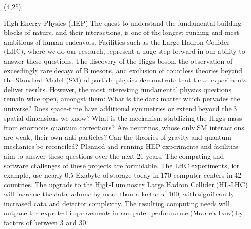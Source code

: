 \documentclass[final]{beamer}
\begin{document}
\begin{frame}{}
\begin{textblock}{38.0}(4,25)
\begin{block}{High Energy Physics (HEP)}
The quest to understand the fundamental building blocks of nature,
and their interactions, is one of the longest running and most
ambitious of human endeavors. Facilities such as the Large Hadron
Collider (LHC), where we do our research, represent a huge step
forward in our ability to answer these questions. The discovery of
the Higgs boson, the observation of exceedingly rare decays of B
mesons, and exclusion of countless theories beyond the Standard
Model (SM) of particle physics demonstrate that these experiments
deliver results. However, the most interesting fundamental physics
questions remain wide open, amongst them: What is the dark matter
which pervades the universe? Does space-time have additional
symmetries or extend beyond the 3 spatial dimensions we know? What
is the mechanism stabilizing the Higgs mass from enormous quantum
corrections? Are neutrinos, whose only SM interactions are weak,
their own anti-particles? Can the theories of gravity and quantum
mechanics be reconciled? Planned and running HEP experiments 
and facilities aim to answer these questions over the next 20 years. 
The computing and software challenges of these projects are formidable. 
The LHC experiments, for example, use nearly 0.5 Exabyte of
storage today in 170 computer centers in 42 countries. 
The upgrade to the High-Luminosity Large Hadron Collider (HL-LHC) will
increase the data volume
by more than a factor of 100, with significantly increased data and detector complexity. The resulting computing needs will outpace the expected improvements in computer performance (Moore's Law) by factors of between 3 and 30. 


\end{block}
\end{textblock}
\end{frame}
\end{document}
